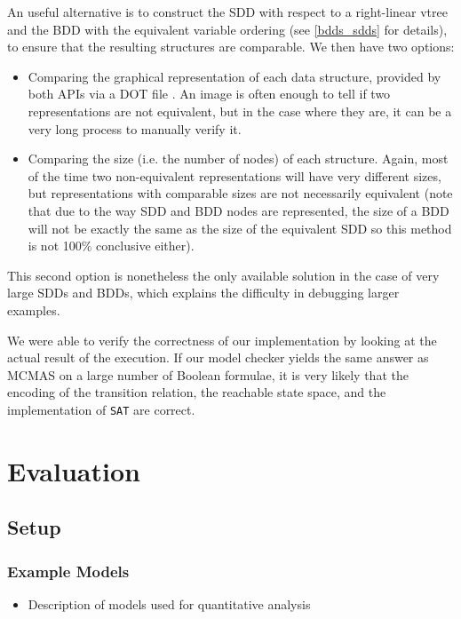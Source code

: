 \documentclass[12]{article}
\begin{document}
An useful alternative is to construct the SDD with respect to a right-linear vtree and the BDD with the equivalent variable ordering (see \ref{bdds_sdds} for details), to ensure that the resulting structures are comparable. We then have two options:
\begin{itemize}

\item Comparing the graphical representation of each data structure, provided by both APIs via a DOT file \cite{dot}. An image is often enough to tell if two representations are not equivalent, but in the case where they are, it can be a very long process to manually verify it.
\item Comparing the size (i.e. the number of nodes) of each structure. Again, most of the time two non-equivalent representations will have very different sizes, but representations with comparable sizes are not necessarily equivalent (note that due to the way SDD and BDD nodes are represented, the size of a BDD will not be exactly the same as the size of the equivalent SDD so this method is not 100\% conclusive either).

\end{itemize}
 This second option is nonetheless the only available solution in the case of very large SDDs and BDDs, which explains the difficulty in debugging larger examples.
 
  We were able to verify the correctness of our implementation by looking at the actual result of the execution. If our model checker yields the same answer as MCMAS on a large number of Boolean formulae, it is very likely that the encoding of the transition relation, the reachable state space, and the implementation of \texttt{SAT} are correct.  

\section{Evaluation} 

\subsection{Setup}

\subsubsection{Example Models}
\begin{itemize}
\item Description of models used for quantitative analysis 
\end{itemize}
\end{document}
